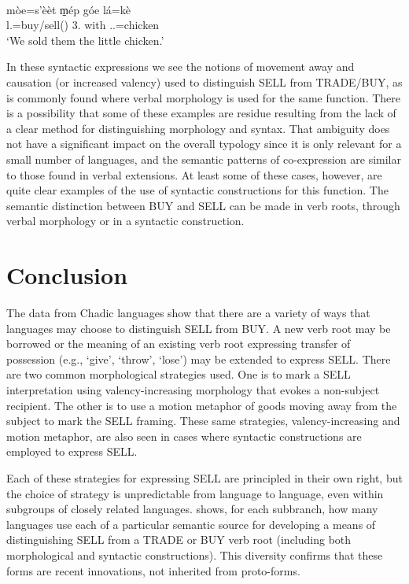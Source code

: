 \ea\label{ex:goem2}
 \\
\gll mòe=s'èèt m̠ép góe lá=kè \\
l.=buy/sell() 3. with ..=chicken \\
\glt `We sold them the little chicken.'
\z 

In these syntactic expressions we see the notions of movement away and causation (or increased valency) used to distinguish SELL from TRADE/BUY, as is commonly found where verbal morphology is used for the same function. There is a possibility that some of these examples are residue resulting from the lack of a clear method for distinguishing morphology and syntax. That ambiguity does not have a significant impact on the overall typology since it is only relevant for a small number of languages, and the semantic patterns of co-expression are similar to those found in verbal extensions. At least some of these cases, however, are quite clear examples of the use of syntactic constructions for this function. The semantic distinction between BUY and SELL can be made in verb roots, through verbal morphology or in a syntactic construction. 

\section{Conclusion}  \label{sec:BUYsummary}

The data from Chadic languages show that there are a variety of ways that languages may choose to distinguish SELL from BUY. A new verb root may be borrowed or the meaning of an existing verb root expressing transfer of possession (e.g., `give', `throw', `lose') may be extended to express SELL. There are two common morphological strategies used. One is to mark a SELL interpretation using valency-increasing morphology that evokes a non-subject recipient. The other is to use a motion metaphor of goods moving away from the subject to mark the SELL framing. These same strategies, valency-increasing and motion metaphor, are also seen in cases where syntactic constructions are employed to express SELL. 

Each of these strategies for expressing SELL are principled in their own right, but the choice of strategy is unpredictable from language to language, even within subgroups of closely related languages.  shows, for each subbranch, how many languages use each of a particular semantic source for developing a means of distinguishing SELL from a TRADE or BUY verb root (including both morphological and syntactic constructions). This diversity confirms that these forms are recent innovations, not inherited from proto-forms.


